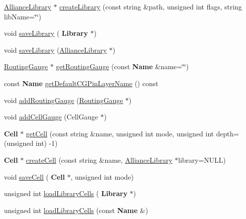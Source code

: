 \begin{DoxyCompactItemize}
\item 
\mbox{\hyperlink{classCRL_1_1AllianceLibrary}{Alliance\+Library}} $\ast$ \mbox{\hyperlink{classCRL_1_1AllianceFramework_a4efc06e6a6d5413398946453c3fd6649}{create\+Library}} (const string \&path, unsigned int flags, string lib\+Name=\char`\"{}\char`\"{})
\item 
void \mbox{\hyperlink{classCRL_1_1AllianceFramework_a5e5a3d137a2c141bf8984877b7f7d18a}{save\+Library}} (\textbf{ Library} $\ast$)
\item 
void \mbox{\hyperlink{classCRL_1_1AllianceFramework_afe7a103d54e865511fd55af90eddcf4e}{save\+Library}} (\mbox{\hyperlink{classCRL_1_1AllianceLibrary}{Alliance\+Library}} $\ast$)
\item 
\mbox{\hyperlink{classCRL_1_1RoutingGauge}{Routing\+Gauge}} $\ast$ \mbox{\hyperlink{classCRL_1_1AllianceFramework_ae102d655820c5d0a29a0200c5e83d42c}{get\+Routing\+Gauge}} (const \textbf{ Name} \&name=\char`\"{}\char`\"{})
\item 
const \textbf{ Name} \mbox{\hyperlink{classCRL_1_1AllianceFramework_ae2bf20fc92a4684bebdab666c68c8aab}{get\+Default\+C\+G\+Pin\+Layer\+Name}} () const
\item 
void \mbox{\hyperlink{classCRL_1_1AllianceFramework_ae182fd150c695fd24c1b10ddbc377b32}{add\+Routing\+Gauge}} (\mbox{\hyperlink{classCRL_1_1RoutingGauge}{Routing\+Gauge}} $\ast$)
\item 
void \mbox{\hyperlink{classCRL_1_1AllianceFramework_aab16db33a0ce2e3bce5739f7cadb3d5a}{add\+Cell\+Gauge}} (Cell\+Gauge $\ast$)
\item 
\textbf{ Cell} $\ast$ \mbox{\hyperlink{classCRL_1_1AllianceFramework_a329d04c188668968308108523d16e2be}{get\+Cell}} (const string \&name, unsigned int mode, unsigned int depth=(unsigned int) -\/1)
\item 
\textbf{ Cell} $\ast$ \mbox{\hyperlink{classCRL_1_1AllianceFramework_ac4381ad0c3799d584ef3ea160846e2bb}{create\+Cell}} (const string \&name, \mbox{\hyperlink{classCRL_1_1AllianceLibrary}{Alliance\+Library}} $\ast$library=N\+U\+LL)
\item 
void \mbox{\hyperlink{classCRL_1_1AllianceFramework_abb34a606c7cd21638b4439701a8dcef9}{save\+Cell}} (\textbf{ Cell} $\ast$, unsigned int mode)
\item 
unsigned int \mbox{\hyperlink{classCRL_1_1AllianceFramework_a2e43b1928a05eea4b2dc1fe0757e4865}{load\+Library\+Cells}} (\textbf{ Library} $\ast$)
\item 
unsigned int \mbox{\hyperlink{classCRL_1_1AllianceFramework_adc8acedeb9daa37b4ab2dee0717835fa}{load\+Library\+Cells}} (const \textbf{ Name} \&)
\end{DoxyCompactItemize}
